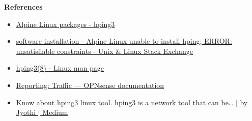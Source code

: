 \documentclass[12pt, a4paper]{article}
\begin{document}
\begin{enumerate}[resume]
    \textbf{References}
    \begin{itemize}
      \item \href{https://pkgs.alpinelinux.org/package/edge/testing/x86_64/hping3}{Alpine Linux packages - hping3}
      \item \href{https://unix.stackexchange.com/questions/371762/alpine-linux-unable-to-install-hping-error-unsatisfiable-constraints}{software installation - Alpine Linux unable to install hping; ERROR: unsatisfiable constraints - Unix \& Linux Stack Exchange}
      \item \href{https://linux.die.net/man/8/hping3}{hping3(8) - Linux man page}
      \item \href{https://docs.opnsense.org/manual/reporting_traffic.html}{Reporting: Traffic — OPNsense  documentation}
      \item \href{https://jyos-sw.medium.com/know-about-hping3-linux-tool-4fdcac05a493}{Know about hping3 linux tool. hping3 is a network tool that can be… | by Jyothi | Medium}
    \end{itemize}
  \end{enumerate}
\end{document}
